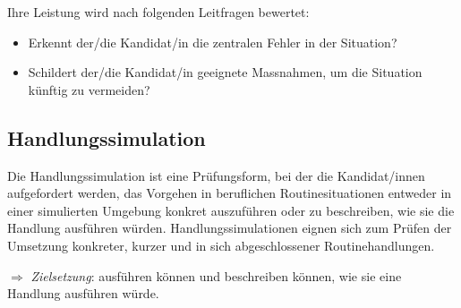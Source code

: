 Ihre Leistung wird nach folgenden Leitfragen bewertet:

\begin{itemize}[noitemsep]
    \item Erkennt der/die Kandidat/in die zentralen Fehler in der Situation?
    \item Schildert der/die Kandidat/in geeignete Massnahmen, um die Situation künftig zu vermeiden?
\end{itemize}

\subsection*{Handlungssimulation}
Die Handlungssimulation ist eine Prüfungsform, bei der die Kandidat/innen aufgefordert werden, das Vorgehen in beruflichen Routinesituationen entweder in einer simulierten Umgebung konkret auszuführen oder zu beschreiben, wie sie die Handlung ausführen würden. Handlungssimulationen eignen sich zum Prüfen der Umsetzung konkreter, kurzer und in sich abgeschlossener Routinehandlungen.
\vspace{1em}

$\Rightarrow$ \emph{Zielsetzung}: ausführen können und beschreiben können, wie sie eine Handlung ausführen würde.

